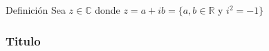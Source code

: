 \begin{frame}[c]{Definición}
  Sea $z \in \mathbb{C}$ donde $z = a + ib = \{ a,b \in \mathbb{R}$ y $ i^2
  = -1 \}$
\end{frame}

\begin{frame}[fragile]
  \frametitle{Titulo}

  \vspace{\baselineskip}
  \begin{lstlisting}[language=Python]
  \end{lstlisting}
\end{frame}
